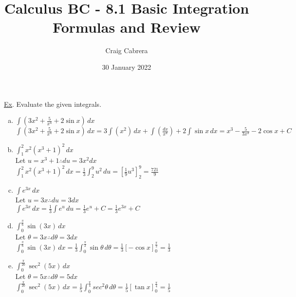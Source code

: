 \documentclass[10pt, letterpaper]{report}
\title{Calculus BC - 8.1 Basic Integration Formulas and Review}
\author{Craig Cabrera}
\date{30 January 2022}
\begin{document}
\maketitle
\underline{Ex}. Evaluate the given integrals.
\begin{enumerate}[(a)]
  \item{$\int{\left(3x^{2}+\frac{5}{x^{4}}+2\sin{x}\right)}\,dx$} \\

    $\int{\left(3x^{2}+\frac{5}{x^{4}}+2\sin{x}\right)}\,dx=
    3\int{\left(x^{2}\right)}\,dx+\int{\left(\frac{dx}{x^{4}}\right)}+2\int{\sin{x}}\,dx=
    x^{3}-\frac{5}{3x^{3}}-2\cos{x}+C$ \\

  \item{$\int_{1}^{2}{x^{2}(x^{3}+1)^{2}}\,dx$} \\

    Let $u=x^{3}+1\therefore du=3x^{2}dx$ \\

    $\int_{1}^{2}{x^{2}(x^{3}+1)^{2}}\,dx=\frac{1}{3}\int_{2}^{9}{u^{2}}\,du=
    [\frac{1}{9}u^{3}]_{2}^{9}=\frac{721}{9}$ \\

  \item{$\int{e^{3x}}\,dx$} \\

    Let $u=3x\therefore du=3dx$ \\

    $\int{e^{3x}}\,dx=\frac{1}{3}\int{e^{u}}\,du=\frac{1}{3}e^{u}+C=\frac{1}{3}e^{3x}+C$ \\

  \item{$\int_{0}^{\frac{\pi}{6}}{\sin{(3x)}}\,dx$} \\

    Let $\theta=3x\therefore d\theta=3dx$ \\

    $\int_{0}^{\frac{\pi}{6}}{\sin{(3x)}}\,dx=
    \frac{1}{3}\int_{0}^{\frac{\pi}{2}}{\sin{\theta}}\,d\theta=
    \frac{1}{3}[-\cos{x}]_{0}^{\frac{\pi}{2}}=\frac{1}{3}$ \\

  \item{$\int_{0}^{\frac{\pi}{20}}{\sec^{2}{(5x)}}\,dx$} \\

    Let $\theta=5x\therefore d\theta=5dx$ \\

    $\int_{0}^{\frac{\pi}{20}}{\sec^{2}{(5x)}}\,dx=
    \frac{1}{5}\int_{0}^{\frac{\pi}{4}}{sec^{2}{\theta}}\,d\theta=
    \frac{1}{5}[\tan{x}]_{0}^{\frac{\pi}{4}}=\frac{1}{5}$ \\


\end{enumerate}
\end{document}
